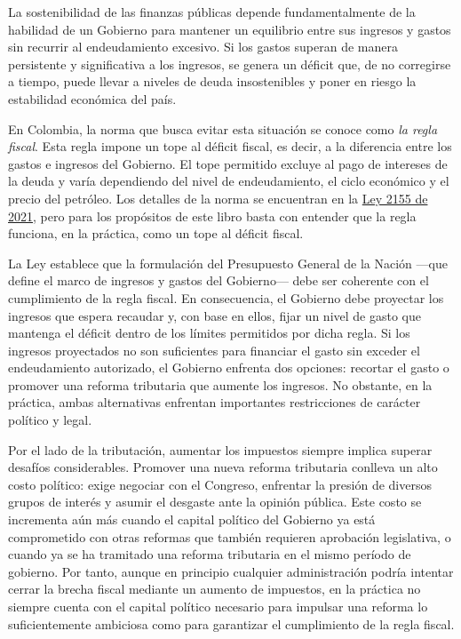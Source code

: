 \begin{introduction}

La sostenibilidad de las finanzas públicas depende fundamentalmente de la habilidad de un Gobierno para mantener un equilibrio entre sus ingresos y gastos sin recurrir al endeudamiento excesivo. Si los gastos superan de manera persistente y significativa a los ingresos, se genera un déficit que, de no corregirse a tiempo, puede llevar a niveles de deuda insostenibles y poner en riesgo la estabilidad económica del país.

En Colombia, la norma que busca evitar esta situación se conoce como  \textit{la regla fiscal}. Esta regla impone un tope al déficit fiscal, es decir, a la diferencia entre los gastos e ingresos del Gobierno. El tope permitido excluye al pago de intereses de la deuda y varía dependiendo del nivel de endeudamiento, el ciclo económico y el precio del petróleo. Los detalles de la norma se encuentran en la \href{https://www.funcionpublica.gov.co/eva/gestornormativo/norma.php?i=170902}{Ley 2155 de 2021}, pero para los propósitos de este libro basta con entender que la regla funciona, en la práctica, como un tope al déficit fiscal.

La Ley establece que la formulación del Presupuesto General de la Nación —que define el marco de ingresos y gastos del Gobierno— debe ser coherente con el cumplimiento de la regla fiscal. En consecuencia, el Gobierno debe proyectar los ingresos que espera recaudar y, con base en ellos, fijar un nivel de gasto que mantenga el déficit dentro de los límites permitidos por dicha regla. Si los ingresos proyectados no son suficientes para financiar el gasto sin exceder el endeudamiento autorizado, el Gobierno enfrenta dos opciones: recortar el gasto o promover una reforma tributaria que aumente los ingresos. No obstante, en la práctica, ambas alternativas enfrentan importantes restricciones de carácter político y legal.

Por el lado de la tributación, aumentar los impuestos siempre implica superar desafíos considerables. Promover una nueva reforma tributaria conlleva un alto costo político: exige negociar con el Congreso, enfrentar la presión de diversos grupos de interés y asumir el desgaste ante la opinión pública. Este costo se incrementa aún más cuando el capital político del Gobierno ya está comprometido con otras reformas que también requieren aprobación legislativa, o cuando ya se ha tramitado una reforma tributaria en el mismo período de gobierno. Por tanto, aunque en principio cualquier administración podría intentar cerrar la brecha fiscal mediante un aumento de impuestos, en la práctica no siempre cuenta con el capital político necesario para impulsar una reforma lo suficientemente ambiciosa como para garantizar el cumplimiento de la regla fiscal.


\end{introduction}
